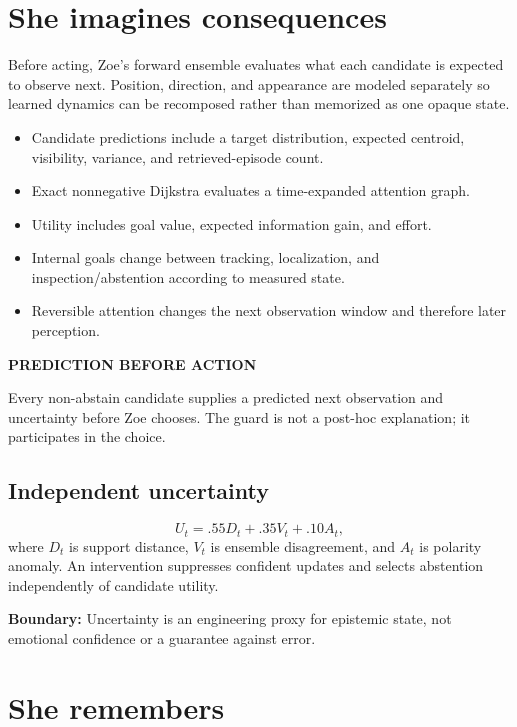 \documentclass[11pt]{article}
\newcommand{\card}[2]{\colorbox{ZoeLight}{\parbox{0.94\textwidth}{\small\textbf{\color{ZoeCyan!50!black}#1}\par\smallskip #2\par}}}
\newcommand{\boundary}[1]{\par\smallskip\small\color{ZoeGray}\textbf{Boundary:} #1\normalsize\par\smallskip}
\begin{document}
\clearpage
\section{She imagines consequences}

Before acting, Zoe's forward ensemble evaluates what each candidate is expected to observe next. Position, direction, and appearance are modeled separately so learned dynamics can be recomposed rather than memorized as one opaque state.

\begin{itemize}
  \item Candidate predictions include a target distribution, expected centroid, visibility, variance, and retrieved-episode count.
  \item Exact nonnegative Dijkstra evaluates a time-expanded attention graph.
  \item Utility includes goal value, expected information gain, and effort.
  \item Internal goals change between tracking, localization, and inspection/abstention according to measured state.
  \item Reversible attention changes the next observation window and therefore later perception.
\end{itemize}

\card{PREDICTION BEFORE ACTION}{Every non-abstain candidate supplies a predicted next observation and uncertainty before Zoe chooses. The guard is not a post-hoc explanation; it participates in the choice.}

\subsection{Independent uncertainty}

\begin{equation}
U_t=.55D_t+.35V_t+.10A_t,
\end{equation}
where $D_t$ is support distance, $V_t$ is ensemble disagreement, and $A_t$ is polarity anomaly. An intervention suppresses confident updates and selects abstention independently of candidate utility.

\boundary{Uncertainty is an engineering proxy for epistemic state, not emotional confidence or a guarantee against error.}

\clearpage
\section{She remembers}
\end{document}
